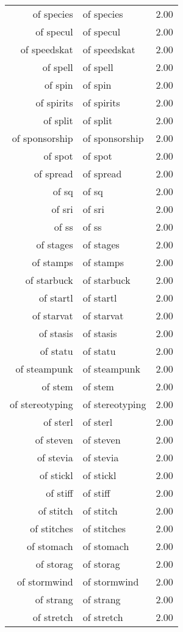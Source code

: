 \begin{table}[ht]
\begin{tabular}{rlr}
  of species & of species & 2.00 \\ 
  of specul & of specul & 2.00 \\ 
  of speedskat & of speedskat & 2.00 \\ 
  of spell & of spell & 2.00 \\ 
  of spin & of spin & 2.00 \\ 
  of spirits & of spirits & 2.00 \\ 
  of split & of split & 2.00 \\ 
  of sponsorship & of sponsorship & 2.00 \\ 
  of spot & of spot & 2.00 \\ 
  of spread & of spread & 2.00 \\ 
  of sq & of sq & 2.00 \\ 
  of sri & of sri & 2.00 \\ 
  of ss & of ss & 2.00 \\ 
  of stages & of stages & 2.00 \\ 
  of stamps & of stamps & 2.00 \\ 
  of starbuck & of starbuck & 2.00 \\ 
  of startl & of startl & 2.00 \\ 
  of starvat & of starvat & 2.00 \\ 
  of stasis & of stasis & 2.00 \\ 
  of statu & of statu & 2.00 \\ 
  of steampunk & of steampunk & 2.00 \\ 
  of stem & of stem & 2.00 \\ 
  of stereotyping & of stereotyping & 2.00 \\ 
  of sterl & of sterl & 2.00 \\ 
  of steven & of steven & 2.00 \\ 
  of stevia & of stevia & 2.00 \\ 
  of stickl & of stickl & 2.00 \\ 
  of stiff & of stiff & 2.00 \\ 
  of stitch & of stitch & 2.00 \\ 
  of stitches & of stitches & 2.00 \\ 
  of stomach & of stomach & 2.00 \\ 
  of storag & of storag & 2.00 \\ 
  of stormwind & of stormwind & 2.00 \\ 
  of strang & of strang & 2.00 \\ 
  of stretch & of stretch & 2.00 \\ 

\end{tabular}
\end{table}
